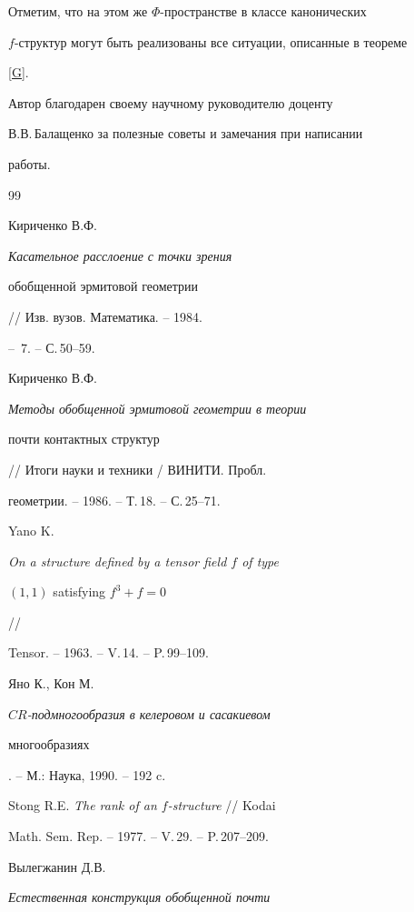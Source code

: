 Отметим, что на этом же $\Phi$-пространстве в классе канонических


$f$-структур могут быть реализованы все ситуации, описанные в теореме


\ref{G}.








Автор благодарен своему научному руководителю доценту


В.В.\,Балащенко за полезные советы и замечания при написании


работы.





\begin{thebibliography}{99}







Кириченко В.Ф. {\em Касательное расслоение с точки зрения


обобщенной эрмитовой геометрии} // Изв. вузов. Математика. -- 1984.


-- \No\,7. -- С.\,50--59.




Кириченко В.Ф. {\em Методы обобщенной эрмитовой геометрии в теории


почти контактных структур} // Итоги науки и техники / ВИНИТИ. Пробл.


геометрии. -- 1986. -- Т.\,18. -- С.\,25--71.




Yano K. {\em On a structure defined by a tensor field $f$ of type


$(1,1)$ satisfying $f^3+f=0$} //


Tensor. -- 1963. -- V.\,14. -- P.\,99--109.




Яно К., Кон М. {\em $CR$-подмногообразия в келеровом и сасакиевом


многообразиях}. -- М.: Наука, 1990. -- 192 c.




Stong R.E. {\em The rank of an $f$-structure} // Kodai


Math. Sem. Rep. -- 1977. -- V.\,29. -- P.\,207--209.




Вылегжанин Д.В. {\em Естественная конструкция обобщенной почти


}
\end{thebibliography}
